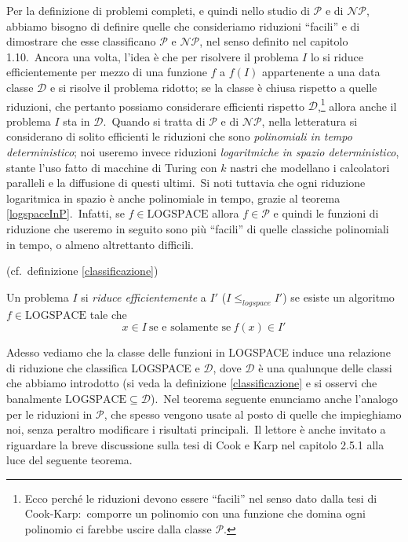 Per la definizione di problemi completi, e quindi nello studio di $\mathcal{P}$ e di $\mathcal{NP}$, abbiamo bisogno di definire quelle che consideriamo riduzioni ``facili'' e di dimostrare che esse classificano $\mathcal{P}$ e $\mathcal{NP}$, nel senso definito nel capitolo 1.10.\
Ancora una volta, l'idea è che per risolvere il problema $I$ lo si riduce efficientemente per mezzo di una funzione $f$ a $f(I)$ appartenente a una data classe $\mathcal{D}$ e si risolve il problema ridotto; se la classe è chiusa rispetto a quelle riduzioni, che pertanto possiamo considerare efficienti rispetto $\mathcal{D}$,\footnote{Ecco perché le riduzioni devono essere ``facili'' nel senso dato dalla tesi di Cook-Karp:\ comporre un polinomio con una funzione che domina ogni polinomio ci farebbe uscire dalla classe $\mathcal{P}$.} allora anche il problema $I$ sta in $\mathcal{D}$.\
Quando si tratta di $\mathcal{P}$ e di $\mathcal{NP}$, nella letteratura si considerano di solito efficienti le riduzioni che sono \textit{polinomiali in tempo deterministico}; noi useremo invece riduzioni \textit{logaritmiche in spazio deterministico}, stante l'uso fatto di macchine di Turing con $k$ nastri che modellano i calcolatori paralleli e la diffusione di questi ultimi.\
Si noti tuttavia che ogni riduzione logaritmica in spazio è anche polinomiale in tempo, grazie al teorema \ref{logspaceInP}.\
Infatti, se $f \in \mathrm{LOGSPACE}$ allora $f \in \mathcal{P}$ e quindi le funzioni di riduzione che useremo in seguito sono più ``facili'' di quelle classiche polinomiali in tempo, o almeno altrettanto difficili.\

\begin{definition}(cf.\ definizione \ref{classificazione})
    \hfill

    Un problema $I$ si \textit{riduce efficientemente} a $I'$ ($I \leqslant_{logspace} I'$) se esiste un algoritmo $f \in \mathrm{LOGSPACE}$ tale che
    \[x \in I\ \mbox{se e solamente se}\ f(x) \in I'\]
\end{definition}

\noindent Adesso vediamo che la classe delle funzioni in LOGSPACE induce una relazione di riduzione che classifica LOGSPACE e $\mathcal{D}$, dove $\mathcal{D}$ è una qualunque delle classi che abbiamo introdotto (si veda la definizione \ref{classificazione} e si osservi che banalmente $\mbox{LOGSPACE} \subseteq \mathcal{D}$).\
Nel teorema seguente enunciamo anche l'analogo per le riduzioni in $\mathcal{P}$, che spesso vengono usate al posto di quelle che impieghiamo noi, senza peraltro modificare i risultati principali.\
Il lettore è anche invitato a riguardare la breve discussione sulla tesi di Cook e Karp nel capitolo 2.5.1 alla luce del seguente teorema.\

